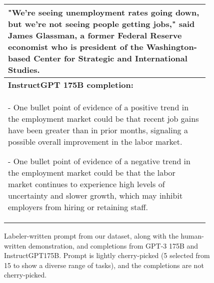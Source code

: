 \begin{figure}[hp]
\begin{tabular}{p{0.95\linewidth}}
"We’re seeing unemployment rates going down, but we’re not seeing people getting jobs," said James Glassman, a former Federal Reserve economist who is president of the Washington-based Center for Strategic and International Studies.
\\ \midrule 
\textbf{InstructGPT 175B completion:} \\
          
- One bullet point of evidence of a positive trend in the employment market could be that recent job gains have been greater than in prior months, signaling a possible overall improvement in the labor market.

- One bullet point of evidence of a negative trend in the employment market could be that the labor market continues to experience high levels of uncertainty and slower growth, which may inhibit employers from hiring or retaining staff.
\\ \bottomrule
    \end{tabular}
    \caption{Labeler-written prompt from our dataset, along with the human-written demonstration, and completions from GPT-3 175B and InstructGPT175B. Prompt is lightly cherry-picked (5 selected from 15 to show a diverse range of tasks), and the completions are not cherry-picked.}
    \label{fig:qual_labeler_1}
\end{figure}




